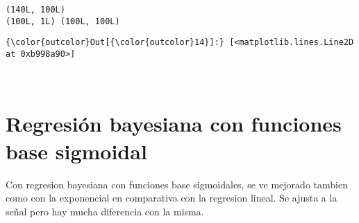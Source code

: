 \documentclass[11pt]{article}
\begin{document}
    \begin{Verbatim}[commandchars=\\\{\}]
(140L, 100L)
(100L, 1L) (100L, 100L)

    \end{Verbatim}

\begin{Verbatim}[commandchars=\\\{\}]
{\color{outcolor}Out[{\color{outcolor}14}]:} [<matplotlib.lines.Line2D at 0xb998a90>]
\end{Verbatim}
            
    \begin{center}
    \end{center}
    { \hspace*{\fill} \\}
    
    \section{Regresión bayesiana con funciones base
sigmoidal}\label{regresiuxf3n-bayesiana-con-funciones-base-sigmoidal}

Con regresion bayesiana con funciones base sigmoidales, se ve mejorado
tambien como con la exponencial en comparativa con la regresion lineal.
Se ajusta a la señal pero hay mucha diferencia con la misma.
\end{document}
